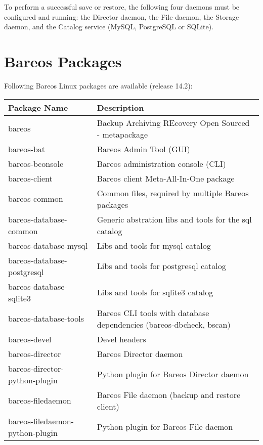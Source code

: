 To perform a successful save or restore, the following four daemons must be
configured and running: the Director daemon, the File daemon, the Storage
daemon, and the Catalog service (MySQL, PostgreSQL or SQLite).


\section{Bareos Packages}
    \label{sec:BareosPackages}

Following Bareos Linux packages are available (release 14.2):

\begin{center}
\begin{tabular}{ | l | l | }
\hline
\textbf{Package Name} & \textbf{Description} \\ \hline
bareos & Backup Archiving REcovery Open Sourced - metapackage \\
bareos-bat & Bareos Admin Tool (GUI) \\
bareos-bconsole & Bareos administration console (CLI) \\
bareos-client & Bareos client Meta-All-In-One package \\
bareos-common & Common files, required by multiple Bareos packages \\
bareos-database-common & Generic abstration libs and tools for the sql catalog \\
bareos-database-mysql & Libs and tools for mysql catalog \\
bareos-database-postgresql & Libs and tools for postgresql catalog \\
bareos-database-sqlite3 & Libs and tools for sqlite3 catalog \\
bareos-database-tools & Bareos CLI tools with database dependencies (bareos-dbcheck, bscan) \\
bareos-devel & Devel headers \\
bareos-director & Bareos Director daemon \\
bareos-director-python-plugin & Python plugin for Bareos Director daemon \\
bareos-filedaemon & Bareos File daemon (backup and restore client) \\
bareos-filedaemon-python-plugin & Python plugin for Bareos File daemon \\

\end{tabular}
\end{center}
